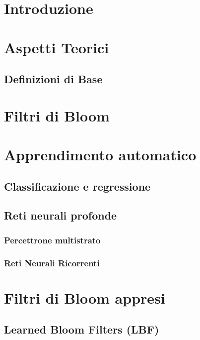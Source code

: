 \documentclass{report}
\begin{document}
\tableofcontents

\chapter{Introduzione}

\chapter{Aspetti Teorici}
\section{Definizioni di Base}

\chapter{Filtri di Bloom}

\chapter{Apprendimento automatico}

\section{Classificazione e regressione}

\section{Reti neurali profonde} %
\subsection{Percettrone multistrato}
\subsection{Reti Neurali Ricorrenti}

\chapter{Filtri di Bloom appresi}
    \section{Learned Bloom Filters (LBF)}
\end{document}
